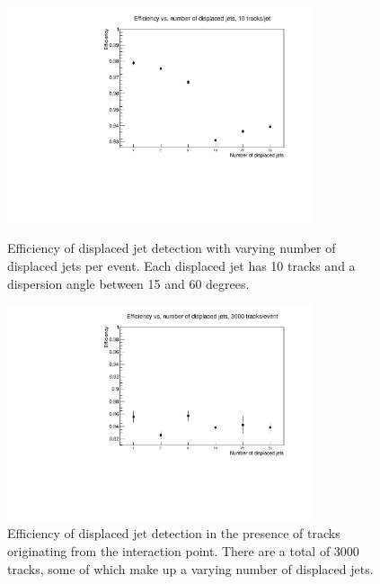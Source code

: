 \documentclass{JINST}
\begin{document}
\begin{figure}[!Hhtb]
\begin{minipage}[t]{8cm}
\begin{center}
\includegraphics[width=0.8\textwidth]{figs/eff_num_jets.pdf} 
 \caption{Efficiency of displaced jet detection with varying number of displaced jets per event.  
Each displaced jet has 10 tracks and a dispersion angle between 15 and 60 degrees.  \label{fig:eff_num_jets}}
\end{center}
\end{minipage}\quad
\begin{minipage}[t]{8cm}
\begin{center}
\includegraphics[width=0.8\textwidth]{figs/eff_jets_plus_tracks.pdf}  
\caption{Efficiency of displaced jet detection in the presence of tracks originating from the interaction point.  
There are a total of 3000 tracks, some of which make up a varying number of displaced jets. \label{fig:eff_jets_plus_tracks}}
\end{center}
\end{minipage}
\end{figure}
\end{document}
